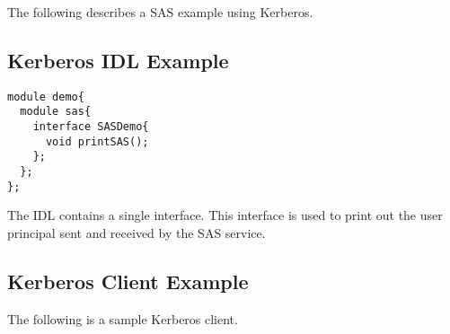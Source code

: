 The following describes a SAS example using Kerberos.

\subsection{Kerberos IDL Example}

\begin{scriptsize}
\begin{verbatim}
module demo{
  module sas{
    interface SASDemo{
      void printSAS();
    };
  };
};
\end{verbatim}
\end{scriptsize}

The IDL contains a single interface. This interface is used to print out
the user principal sent and received by the SAS service.

\subsection{Kerberos Client Example}

The following is a sample Kerberos client.

